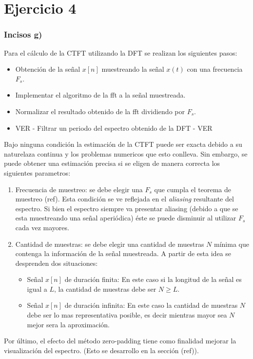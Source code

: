 \documentclass[letterpaper]{article}
\begin{document}
\section{Ejercicio 4}
\subsubsection*{Incisos g)}
 Para el cálculo de la CTFT utilizando la DFT se realizan los siguientes pasos:
 \begin{itemize}
     \item Obtención de la señal $x[n]$ muestreando la señal $x(t)$ con una frecuencia $F_s$.
     \item Implementar el algoritmo de la fft a la señal muestreada.
     \item Normalizar el resultado obtenido de la fft dividiendo por $F_s$.
     \item VER - Filtrar un periodo del espectro obtenido de la DFT - VER
 \end{itemize}

 Bajo ninguna condición la estimación de la CTFT puede ser exacta debido a su naturelaza continua y los problemas numericos que esto conlleva. Sin embargo, se puede obtener una 
 estimación precisa si se eligen de manera correcta los siguientes parametros:
 \begin{enumerate}
     \item Frecuencia de muestreo: se debe elegir una $F_s$ que cumpla el teorema de muestreo (ref). Esta condición se ve reflejada en el \textit{aliasing} resultante del espectro. Si bien el espectro siempre va presentar aliasing (debido a que se esta muestreando una señal aperiódica) éste se puede disminuir al utilizar $F_s$ cada vez mayores.
     \item Cantidad de muestras: se debe elegir una cantidad de muestras $N$ mínima que contenga la información de la señal muestreada. A partir de esta idea se desprenden dos situaciones:
     \begin{itemize}
         \item Señal $x[n]$ de duración finita: En este caso si la longitud de la señal es igual a $L$, la cantidad de muestras debe ser $N \geq L$.
         \item Señal $x[n]$ de duración infinita: En este caso la cantidad de muestras $N$ debe ser lo mas representativa posible, es decir mientras mayor sea $N$ mejor sera la aproximación.
     \end{itemize}
\end{enumerate}

Por último, el efecto del método zero-padding tiene como finalidad mejorar la visualización del espectro. (Esto se desarrollo en la sección (ref)).
    
\end{document}
